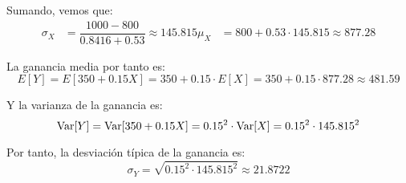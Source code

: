 \begin{ejercicio}
    Sumando, vemos que:
    \begin{align*}
        \sigma_X &= \dfrac{1000-800}{0.8416+0.53} \approx 145.815
        \mu_X &= 800 + 0.53\cdot 145.815 \approx 877.28
    \end{align*}

    La ganancia media por tanto es:
    \begin{equation*}
        E[Y] = E[350+0.15X] = 350 + 0.15\cdot E[X] = 350 + 0.15\cdot 877.28 \approx 481.59
    \end{equation*}

    Y la varianza de la ganancia es:
    \begin{equation*}
        \operatorname{Var}[Y] = \operatorname{Var}[350+0.15X] = 0.15^2\cdot \operatorname{Var}[X] = 0.15^2\cdot 145.815^2
    \end{equation*}

    Por tanto, la desviación típica de la ganancia es:
    \begin{equation*}
        \sigma_Y = \sqrt{0.15^2\cdot 145.815^2} \approx 21.8722
    \end{equation*}
\end{ejercicio}

